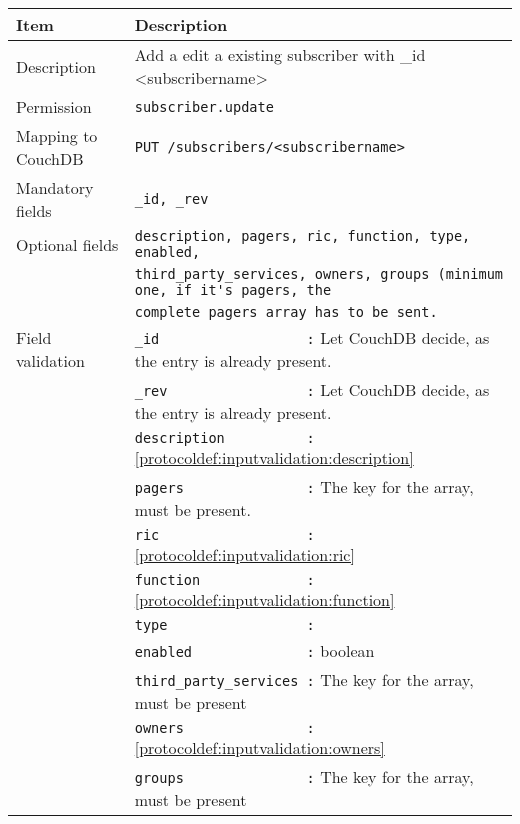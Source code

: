 \begin{table}[htbp]
  \begin{tabular}{|l|p{12cm}|} \hline
    Item               & Description  \\ \hline \hline
    Description        & Add a edit a existing subscriber with \_id <subscribername>\\ \hline
    Permission         & \verb|subscriber.update| \\ \hline
    Mapping to CouchDB & \verb|PUT /subscribers/<subscribername>|\\ \hline
    Mandatory fields   & \verb|_id, _rev| \\ \hline
    Optional fields    & \verb|description, pagers, ric, function, type, enabled,| \\
                       & \verb|third_party_services, owners, groups (minimum one, if it's pagers, the| \\
                       & \verb|complete pagers array has to be sent.| \\ \hline
    Field validation   & \verb|_id                  :| Let CouchDB decide, as the entry is already present. \\
                       & \verb|_rev                 :| Let CouchDB decide, as the entry is already present. \\
                       & \verb|description          :| \ref{protocoldef:inputvalidation:description}\\
                       & \verb|pagers               :| The key for the array, must be present.\\
                       & \verb|ric                  :| \ref{protocoldef:inputvalidation:ric} \\
                       & \verb|function             :| \ref{protocoldef:inputvalidation:function} \\
                       & \verb|type                 :|  \\
                       & \verb|enabled              :|  boolean \\
                       & \verb|third_party_services :| The key for the array, must be present \\
                       & \verb|owners               :| \ref{protocoldef:inputvalidation:owners} \\
                       & \verb|groups               :| The key for the array, must be present \\ \hline
  \end{tabular}
\end{table}

